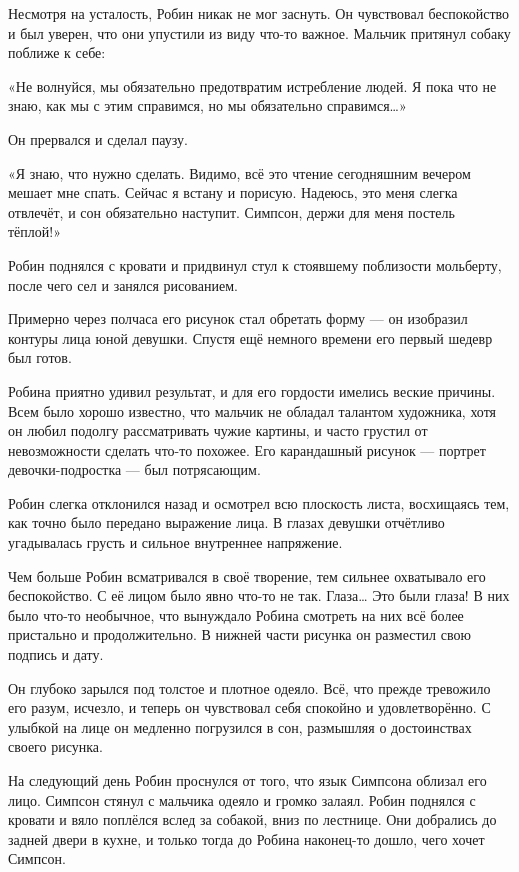\documentclass[a4paper,12pt]{book}
\begin{document}
\par
Несмотря на усталость, Робин никак не мог заснуть. Он чувствовал беспокойство и был уверен, что они упустили из виду что-то важное. Мальчик притянул собаку поближе к себе:
\par
«Не волнуйся, мы обязательно предотвратим истребление людей. Я пока что не знаю, как мы с этим справимся, но мы обязательно справимся…»
\par
Он прервался и сделал паузу.
\par
«Я знаю, что нужно сделать. Видимо, всё это чтение сегодняшним вечером мешает мне спать. Сейчас я встану и порисую. Надеюсь, это меня слегка отвлечёт, и сон обязательно наступит. Симпсон, держи для меня постель тёплой!»\\
\par
Робин поднялся с кровати и придвинул стул к стоявшему поблизости мольберту, после чего сел и занялся рисованием.
\par
Примерно через полчаса его рисунок стал обретать форму — он изобразил контуры лица юной девушки. Спустя ещё немного времени его первый шедевр был готов.
\par
Робина приятно удивил результат, и для его гордости имелись веские причины. Всем было хорошо известно, что мальчик не обладал талантом художника, хотя он любил подолгу рассматривать чужие картины, и часто грустил от невозможности сделать что-то похожее. Его карандашный рисунок — портрет девочки-подростка — был потрясающим.
\par
Робин слегка отклонился назад и осмотрел всю плоскость листа, восхищаясь тем, как точно было передано выражение лица. В глазах девушки отчётливо угадывалась грусть и сильное внутреннее напряжение.\\
\par
Чем больше Робин всматривался в своё творение, тем сильнее охватывало его беспокойство. С её лицом было явно что-то не так. Глаза… Это были глаза! В них было что-то необычное, что вынуждало Робина смотреть на них всё более пристально и продолжительно. В нижней части рисунка он разместил свою подпись и дату.\\
\par
Он глубоко зарылся под толстое и плотное одеяло. Всё, что прежде тревожило его разум, исчезло, и теперь он чувствовал себя спокойно и удовлетворённо. С улыбкой на лице он медленно погрузился в сон, размышляя о достоинствах своего рисунка.\\
\par
На следующий день Робин проснулся от того, что язык Симпсона облизал его лицо. Симпсон стянул с мальчика одеяло и громко залаял. Робин поднялся с кровати и вяло поплёлся вслед за собакой, вниз по лестнице. Они добрались до задней двери в кухне, и только тогда до Робина наконец-то дошло, чего хочет Симпсон.\\
\end{document}
